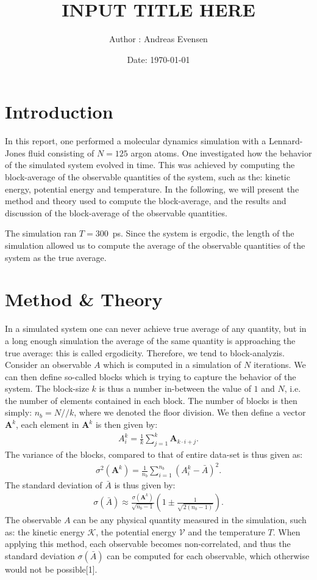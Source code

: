 \documentclass[a4paper]{article}
\title{INPUT TITLE HERE}
\author{Author : Andreas Evensen}
\date{Date: \today}
\newcommand{\newparagraph}{\vspace{.5cm}\noindent}
\begin{document}


\newpage
{}
\setcounter{page}{1}
\newpage
\tableofcontents
\newpage
{}

\section{Introduction}
In this report, one performed a molecular dynamics simulation with a Lennard-Jones fluid consisting of $N = 125$ argon atoms.
One investigated how the behavior of the simulated system evolved in time.
This was achieved by computing the block-average of the observable quantities of the system, such as the: kinetic energy, potential energy and temperature.
In the following, we will present the method and theory used to compute the block-average, and the results and discussion of the block-average of the observable quantities.

\newparagraph
The simulation ran $T = 300$~ps. Since the system is ergodic, the length of the simulation allowed us to compute the average of the observable quantities of the system as the true average.
\section{Method \& Theory}
In a simulated system one can never achieve true average of any quantity, but in a long enough simulation the average of the same quantity is approaching the true average: this is called ergodicity.
Therefore, we tend to block-analyzis.
Consider an observable $A$ which is computed in a simulation of $N$ iterations.
We can then define so-called blocks which is trying to capture the behavior of the system.
The block-size $k$ is thus a number in-between the value of $1$ and $N$, i.e. the number of elements contained in each block.
The number of blocks is then simply: $n_b = N // k$, where we denoted the floor division. We then define a vector $\mathbf{A}^k$, each element in $\mathbf{A}^k$ is then given by:
\begin{align*}
    A_i^{k} = \frac{1}{k}\sum_{j = 1}^k \mathbf{A}_{k\cdot i + j}.
\end{align*}The variance of the blocks, compared to that of entire data-set is thus given as:
\begin{align*}
    \sigma^2(\mathbf{A}^k) = \frac{1}{n_b}\sum_{i = 1}^{n_b}\left(A_i^k - \bar{A}\right)^2.
\end{align*}The standard deviation of $\bar{A}$ is thus given by:
\begin{align}
    \sigma(\bar{A}) \approx \frac{\sigma(\mathbf{A}^k)}{\sqrt{n_b - 1}}\left(1 \pm \frac{1}{\sqrt{2(n_b - 1)}}\right).\label{eq: standard diviation}
\end{align}The observable $A$ can be any physical quantity measured in the simulation, such as: the kinetic energy $\mathcal{K}$, the potential energy $\mathcal{V}$ and the temperature $T$.
When applying this method, each observable becomes non-correlated, and thus the standard deviation $\sigma(\bar{A})$ can be computed for each observable, which otherwise would not be possible[1].
\end{document}
